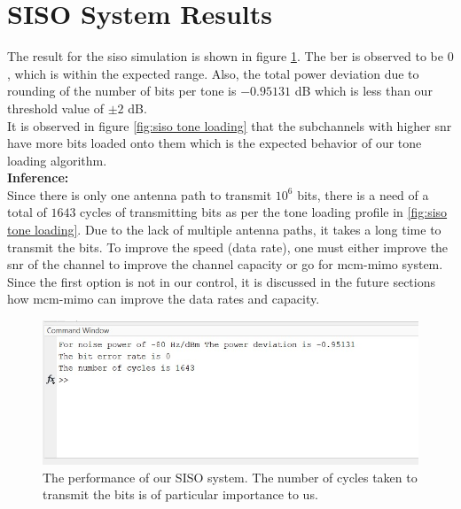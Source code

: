 \section{SISO System Results}
The result for the \acrshort{siso} simulation is shown in figure \ref{fig:siso system performance}. The \acrshort{ber} is observed to be $0$, which is within the expected range. Also, the total power deviation due to rounding of the number of bits per tone is $-0.95131$ dB which is less than our threshold value of $\pm 2$ dB.\\
It is observed in figure \ref{fig:siso tone loading} that the subchannels with higher \acrshort{snr} have more bits loaded onto them which is the expected behavior of our tone loading algorithm.\\
\textbf{Inference:}\\
Since there is only one antenna path to transmit $10^6$ bits, there is a need of a total of $1643$ cycles of transmitting bits as per the tone loading profile in \ref{fig:siso tone loading}. Due to the lack of multiple antenna paths, it takes a long time to transmit the bits. To improve the speed (data rate), one must either improve the \acrshort{snr} of the channel to improve the channel capacity or go for \acrshort{mcm}-\acrshort{mimo} system. Since the first option is not in our control, it is discussed in the future sections how \acrshort{mcm}-\acrshort{mimo} can improve the data rates and capacity.

\begin{figure}[!htbp]
\centering
\includegraphics[scale=1]{Chapter 4/Figures/SISO System Performance}
\caption[SISO Tone Loading]{The performance of our SISO system. The number of cycles taken to transmit the bits is of particular importance to us. }
\label{fig:siso system performance}
\end{figure}

